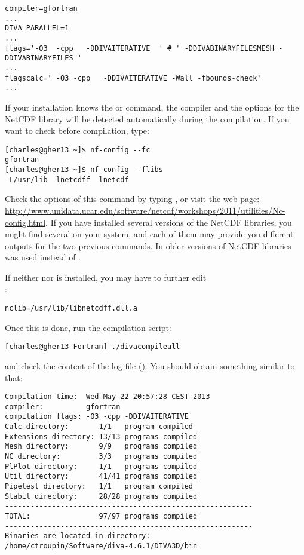 \begin{verbatim}
compiler=gfortran
...
DIVA_PARALLEL=1
...
flags='-O3  -cpp   -DDIVAITERATIVE  ' # ' -DDIVABINARYFILESMESH -DDIVABINARYFILES '
...
flagscalc=' -O3 -cpp   -DDIVAITERATIVE -Wall -fbounds-check'
...
\end{verbatim}

If your installation knows the  or  command, the compiler and the options for the NetCDF  library will be detected automatically during the compilation. If you want to check before compilation, type:
\begin{lstlisting}[style=Bash]
[charles@gher13 ~]$ nf-config --fc
gfortran
[charles@gher13 ~]$ nf-config --flibs
-L/usr/lib -lnetcdff -lnetcdf
\end{lstlisting}
Check the options of this command by typing , or visit the web page: \url{http://www.unidata.ucar.edu/software/netcdf/workshops/2011/utilities/Nc-config.html}. If you have installed several versions of the NetCDF libraries, you might find several  on your system, and each of them may provide you different outputs for the two previous commands. In older versions of NetCDF libraries  was used instead of .

If neither  nor  is installed, you may have to further edit\\ 
:
\begin{verbatim}
nclib=/usr/lib/libnetcdff.dll.a
\end{verbatim}

Once this is done, run the compilation script: 
\begin{lstlisting}[style=Bash]
[charles@gher13 Fortran] ./divacompileall
\end{lstlisting}
and check the content of the log file (). You should obtain something similar to that:
\begin{verbatim}
Compilation time:  Wed May 22 20:57:28 CEST 2013
compiler:          gfortran
compilation flags: -O3 -cpp -DDIVAITERATIVE
Calc directory:       1/1   program compiled
Extensions directory: 13/13 programs compiled
Mesh directory:       9/9   programs compiled
NC directory:         3/3   programs compiled
PlPlot directory:     1/1   programs compiled
Util directory:       41/41 programs compiled
Pipetest directory:   1/1   program compiled
Stabil directory:     28/28 programs compiled
----------------------------------------------------------
TOTAL:                97/97 programs compiled
----------------------------------------------------------
Binaries are located in directory:
/home/ctroupin/Software/diva-4.6.1/DIVA3D/bin
\end{verbatim}

